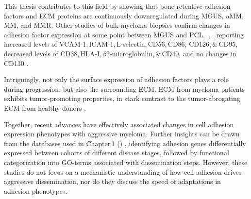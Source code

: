 This thesis contributes to this field by showing that bone-retentive adhesion
factors and \ac{ECM} proteins are continuously downregulated during \ac{MGUS},
\ac{aMM}, \ac{MM}, and \ac{MMR}. Other studies of bulk myeloma biopsies confirm
changes in adhesion factor expression at some point between \ac{MGUS} and
\ac{PCL}%
\,%
,~%
reporting %
increased levels of VCAM-1,\,ICAM-1,\,L-selectin,\,CD56,\,CD86,
CD126,\,\&\,CD95, %
decreased levels of CD38,\,HLA-I,\,$\beta$2-microglobulin,\,\&\,CD40, and %
no changes in CD130 %
\cite{terposIncreasedCirculatingVCAM12016, perez-andresClonalPlasmaCells2005}.

Intriguingly, not only the surface expression of adhesion factors plays a role
during progression, but also the surrounding \ac{ECM}. \ac{ECM} from myeloma
patients exhibits tumor-promoting properties, in stark contrast to the
tumor-abrogating \ac{ECM} from healthy donors
\cite{ibraheemBMMSCsderivedECMModifies2019}.

Together, recent advances have effectively associated changes in cell adhesion
expression phenotypes with aggressive myeloma. Further insights can be drawn
from the databases used in Chapter\,1 ()
\cite{seckingerCD38ImmunotherapeuticTarget2018}, identifying adhesion genes
differentially expressed between cohorts of different disease stages, followed by
functional categorization into GO-terms associated with dissemination steps.
However, these studies do not focus on a mechanistic understanding of how cell
adhesion drives aggressive dissemination, nor do they discuss the speed of
adaptations in adhesion phenotypes.


